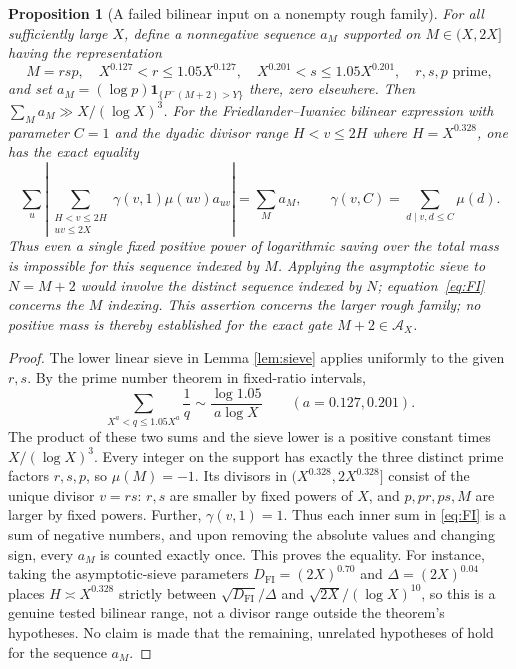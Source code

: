 \documentclass[11pt]{article}
\newtheorem{proposition}[theorem]{Proposition}
\newcommand{\one}{\mathbf 1}
\newcommand{\aset}{\mathcal A}
\newcommand{\phimin}{P^-}
\begin{document}
\begin{proposition}[A failed bilinear input on a nonempty rough family]
\label{prop:fi}
For all sufficiently large $X$, define a nonnegative sequence $a_M$
supported on $M\in(X,2X]$ having the representation
\[
 M=rsp,\quad X^{0.127}<r\le1.05X^{0.127},\quad
 X^{0.201}<s\le1.05X^{0.201},\quad r,s,p\text{ prime},
\]
and set $a_M=(\log p)\one_{\{\phimin(M+2)>Y\}}$ there, zero elsewhere.
Then $\sum_Ma_M\gg X/(\log X)^3$.
For the Friedlander--Iwaniec bilinear expression with parameter
$C=1$ and the dyadic divisor range $H<v\le2H$ where $H=X^{0.328}$,
one has the \emph{exact} equality
\begin{equation}\label{eq:FI}
 \sum_u\left|\sum_{\substack{H<v\le2H\\uv\le2X}}
  \gamma(v,1)\mu(uv)a_{uv}\right|=\sum_Ma_M,
 \qquad \gamma(v,C)=\sum_{d\mid v,d\le C}\mu(d).
\end{equation}
Thus even a single fixed positive power of logarithmic saving over
the total mass is impossible for this sequence indexed by \(M\).
Applying the asymptotic sieve to \(N=M+2\) would involve the distinct
sequence indexed by \(N\); equation~\eqref{eq:FI} concerns the \(M\) indexing.
This assertion concerns the larger rough family; no positive mass
is thereby established for the exact gate $M+2\in\aset_X$.
\end{proposition}

\begin{proof}
The lower linear sieve in Lemma \ref{lem:sieve} applies uniformly
to the given $r,s$.  By the prime number theorem in fixed-ratio
intervals,
\[
 \sum_{X^a<q\le1.05X^a}\frac1q
  \sim\frac{\log1.05}{a\log X}
 \qquad(a=0.127,0.201).
\]
The product of these two sums and the sieve lower is a positive
constant times $X/(\log X)^3$.
Every integer on the support has exactly the three distinct prime
factors $r,s,p$, so $\mu(M)=-1$.  Its divisors in
$(X^{0.328},2X^{0.328}]$ consist of the unique divisor $v=rs$:
$r,s$ are smaller by fixed powers of $X$, and $p,pr,ps,M$ are
larger by fixed powers.  Further, $\gamma(v,1)=1$.
Thus each inner sum in \eqref{eq:FI} is a sum of negative
numbers, and upon removing the absolute values and changing sign,
every $a_M$ is counted exactly once.  This proves the equality.
For instance, taking the asymptotic-sieve parameters
$D_{\mathrm{FI}}=(2X)^{0.70}$ and
$\Delta=(2X)^{0.04}$ places $H\asymp X^{0.328}$ strictly between
$\sqrt{D_{\mathrm{FI}}}/\Delta$ and
$\sqrt{2X}/(\log X)^{10}$, so this is a genuine tested bilinear
range, not a divisor range outside the theorem's hypotheses.
No claim is made that the remaining, unrelated hypotheses of
\cite{FI1998} hold for the sequence $a_M$.
\end{proof}
\end{document}
